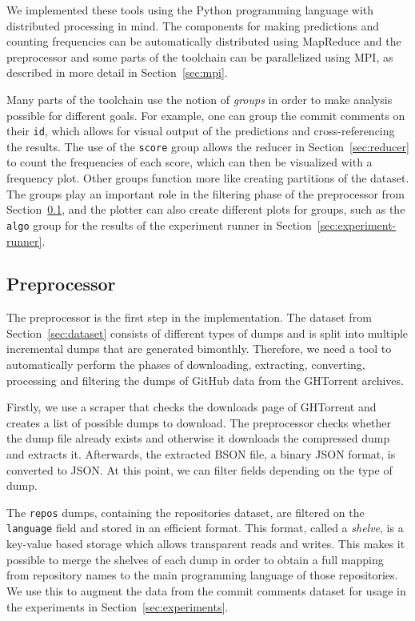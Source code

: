 \documentclass{article}
\begin{document}
We implemented these tools using the Python programming language with 
distributed processing in mind. The components for making predictions and 
counting frequencies can be automatically distributed using MapReduce and the 
preprocessor and some parts of the toolchain can be parallelized using MPI, as 
described in more detail in Section~\ref{sec:mpi}.

Many parts of the toolchain use the notion of \emph{groups} in order to make 
analysis possible for different goals. For example, one can group the commit 
comments on their {\tt id}, which allows for visual output of the predictions 
and cross-referencing the results. The use of the {\tt score} group allows the 
reducer in Section~\ref{sec:reducer} to count the frequencies of each score, 
which can then be visualized with a frequency plot. Other groups function more 
like creating partitions of the dataset. The groups play an important role in
the filtering phase of the preprocessor from Section~\ref{sec:preprocessor},
and the plotter can also create different plots for groups, such as the
{\tt algo} group for the results of the experiment runner in
Section~\ref{sec:experiment-runner}.

\subsection{Preprocessor}\label{sec:preprocessor}
The preprocessor is the first step in the implementation. The dataset from 
Section~\ref{sec:dataset} consists of different types of dumps and is split 
into multiple incremental dumps that are generated bimonthly. Therefore, we 
need a tool to automatically perform the phases of downloading, extracting, 
converting, processing and filtering the dumps of GitHub data from the 
GHTorrent archives.

Firstly, we use a scraper that checks the downloads page of GHTorrent and 
creates a list of possible dumps to download. The preprocessor checks whether 
the dump file already exists and otherwise it downloads the compressed dump and 
extracts it. Afterwards, the extracted BSON file, a binary JSON format, is 
converted to JSON\@. At this point, we can filter fields depending on the 
type of dump.

The {\tt repos} dumps, containing the repositories dataset, are filtered on the 
{\tt language} field and stored in an efficient format. This format, called a
\emph{shelve}, is a key-value based storage which allows transparent reads and 
writes. This makes it possible to merge the shelves of each dump in order to 
obtain a full mapping from repository names to the main programming language of 
those repositories. We use this to augment the data from the commit comments
dataset for usage in the experiments in Section~\ref{sec:experiments}.
\end{document}
